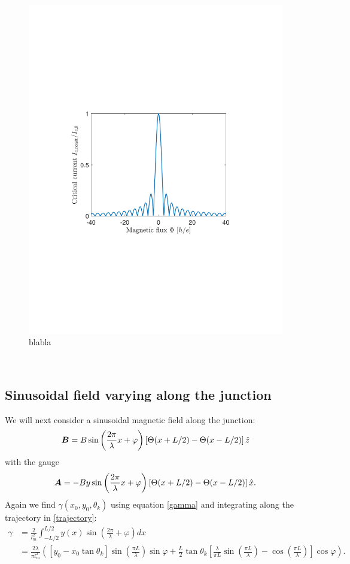 \begin{figure}[hhh]
\centering
\includegraphics[width=12cm,clip=true,trim=3cm 8cm 3cm 8cm]{fig/Fraunhofer}
\caption{blabla}
\label{fig:Fraunhofer}
\end{figure}
\\
\subsection{Sinusoidal field varying along the junction}
We will next consider a sinusoidal magnetic field along the junction:
\begin{equation}
    \boldsymbol{B} = B\sin\left(\frac{2\pi}{\lambda}x + \varphi\right)\left[\Theta(x+L/2) - \Theta(x-L/2) \right]\hat{z}
\end{equation}
with the gauge
\begin{equation}
    \boldsymbol{A} = -By\sin\left(\frac{2\pi}{\lambda}x + \varphi\right)\left[\Theta(x+L/2) - \Theta(x-L/2) \right]\hat{x}.
\end{equation}
Again we find $\gamma(x_0,y_0,\theta_k)$ using equation \eqref{gamma} and integrating along the trajectory in \eqref{trajectory}:
\begin{equation}
\begin{split}
    \gamma &= \frac{2}{l_m^2}\int_{-L/2}^{L/2}y(x)\sin\left(\frac{2\pi}{\lambda} +\varphi \right) dx \\
    &= \frac{2\lambda}{\pi l_m^2}\left(\left[y_0 - x_0\tan\theta_k\right]\sin\left(\frac{\pi L}{\lambda}\right)\sin\varphi+\frac{L}{2}\tan\theta_k\left[\frac{\lambda}{\pi L}\sin\left(\frac{\pi L}{\lambda}\right)-\cos\left(\frac{\pi L}{\lambda}\right)\right]\cos\varphi\right).
\end{split}
\label{gamma2}
\end{equation}

